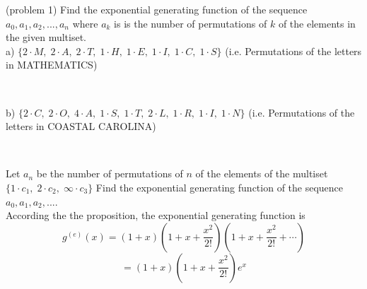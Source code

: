 \documentclass[handout]{ximera}
\begin{document}
\begin{problem}(problem 1)
Find the exponential generating function of the sequence $a_0, a_1, a_2, ..., a_{n}$ where $a_k$ is is the number of 
permutations of $k$ of the elements in the given multiset.\\
a) $\{2\cdot M,\; 2\cdot A,\; 2 \cdot T,\; 1\cdot H,\; 1\cdot E,\; 1\cdot I,\; 1\cdot C,\; 1\cdot S\}$ 
(i.e. Permutations of the letters in MATHEMATICS)
\begin{multipleChoice}
\\
\end{multipleChoice}



b) $\{2\cdot C,\; 2\cdot O,\; 4\cdot A,\; 1\cdot S,\; 1\cdot T,\; 2\cdot L,\; 1\cdot R,\; 1\cdot I,\; 1\cdot N\}$ 
(i.e. Permutations of the letters in COASTAL CAROLINA)
\begin{multipleChoice}
\\
\end{multipleChoice}

\end{problem}




\begin{example}[example 2]
Let $a_n$ be the number of permutations of $n$ of the elements of the multiset $\{1 \cdot c_1,\; 2 \cdot c_2,\; \infty \cdot c_3\}$
Find the exponential generating function of the sequence $a_0, a_1, a_2, ...$.\\
According the the proposition, the exponential generating function is
\[
g^{(e)}(x) = (1+x)\left(1 + x + \frac{x^2}{2!}\right)\left(1 + x + \frac{x^2}{2!} + \cdots \right)
\]
\[
= (1+x)\left(1 + x + \frac{x^2}{2!}\right)e^x
\]
\end{example}
\end{document}
